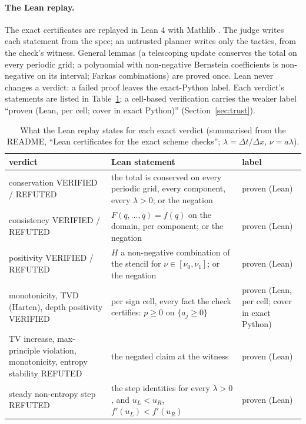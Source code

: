 \documentclass[11pt,a4paper]{article}
\newcommand{\V}{\textsf{VERIFIED}}
\newcommand{\R}{\textsf{REFUTED}}
\begin{document}
\paragraph{The Lean replay.} The exact certificates are replayed in Lean 4 \cite{lean4} with Mathlib
\cite{mathlib2020}. The judge writes each statement from the spec; an untrusted planner writes only
the tactics, from the check's witness. General lemmas (a telescoping update conserves the total on
every periodic grid; a polynomial with non-negative Bernstein coefficients is non-negative on its
interval; Farkas combinations) are proved once. Lean never changes a verdict: a failed proof leaves the
exact-Python label. Each verdict's statements are listed in Table~\ref{tab:leanscope}; a cell-based
verification carries the weaker label ``proven (Lean, per cell; cover in exact Python)''
(Section~\ref{sec:trust}).

\begin{table}[t]\small
\caption{What the Lean replay states for each exact verdict (summarised from the README, ``Lean certificates for
the exact scheme checks''; $\lambda = \Delta t/\Delta x$, $\nu = a\lambda$).}\label{tab:leanscope}
\begin{tabularx}{\linewidth}{@{}>{\raggedright\arraybackslash}p{4.3cm}>{\raggedright\arraybackslash}X>{\raggedright\arraybackslash}p{2.6cm}@{}}
\toprule
verdict & Lean statement & label \\ \midrule
conservation \V{} / \R & the total is conserved on every periodic grid, every component, every $\lambda > 0$; or the negation & proven (Lean) \\
consistency \V{} / \R & $F(q, \ldots, q) = f(q)$ on the domain, per component; or the negation & proven (Lean) \\
positivity \V{} / \R & $H$ a non-negative combination of the stencil for $\nu \in [\nu_0, \nu_1]$; or the negation & proven (Lean) \\
monotonicity, TVD (Harten), depth positivity \V & per sign cell, every fact the check certifies: $p \ge 0$ on $\{a_j \ge 0\}$ & proven (Lean, per cell; cover in exact Python) \\
TV increase, max-principle violation, monotonicity, entropy stability \R & the negated claim at the witness & proven (Lean) \\
steady non-entropy step \R & the step identities for every $\lambda > 0$, and $u_L < u_R$, $f'(u_L) < f'(u_R)$ & proven (Lean) \\
\bottomrule
\end{tabularx}
\end{table}
\end{document}
